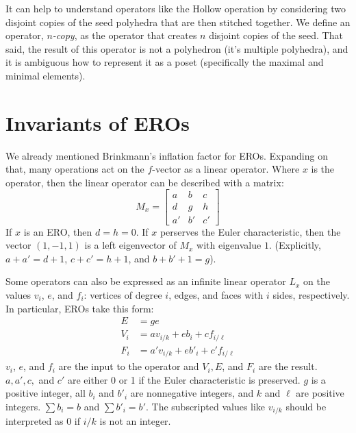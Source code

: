 \documentclass{amsart}[12pt]
\begin{document}
It can help to understand operators like the Hollow operation by considering
two disjoint copies of the seed polyhedra that are then stitched together. We
define an operator, \textit{$n$-copy}, as the operator that creates $n$
disjoint copies of the seed. That said, the result of this operator is not a
polyhedron (it's multiple polyhedra), and it is ambiguous how to represent it
as a poset (specifically the maximal and minimal elements).

\section{Invariants of EROs}
We already mentioned Brinkmann's inflation factor for EROs. \cite{brinkmann}
Expanding on that, many operations act on the $f$-vector as a linear operator.
Where $x$ is the operator, then the linear operator can be described with a
matrix:
\begin{equation}
  M_x = \begin{bmatrix}
  a & b & c \\
  d & g & h \\
  a' & b' & c' \end{bmatrix}
\end{equation}
If $x$ is an ERO, then $d = h= 0$. If $x$ perserves the Euler characteristic,
then the vector $(1,-1,1)$ is a left eigenvector of $M_x$ with eigenvalue $1$.
(Explicitly, $a + a' = d + 1$, $c+ c' = h+1$, and $b + b' + 1 = g$).

Some operators can also be expressed as an infinite linear operator $L_x$ on
the values $v_i$, $e$, and $f_i$: vertices of degree $i$, edges, and faces with $i$ sides, respectively. In particular, EROs take this form:
\begin{equation}
  \begin{split}
  E & = ge \\
  V_i & = a v_{i/k} + e b_i + c f_{i/\ell} \\
  F_i & = a' v_{i/k} + e b'_i + c' f_{i/\ell}
  \end{split}
\end{equation}
$v_i$, $e$, and $f_i$ are the input to the operator and $V_i, E$, and $F_i$ are
the result. $a, a', c,$ and $c'$ are either 0 or 1 if the Euler characteristic
is preserved. $g$ is a positive integer, all $b_i$ and $b'_i$ are nonnegative
integers, and $k$ and $\ell$ are positive integers.
$\sum b_i = b$ and $\sum b'_i = b'$. The subscripted
values like $v_{i/k}$ should be interpreted as 0 if $i/k$ is not an integer.
\end{document}
